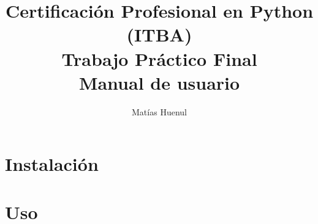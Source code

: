 \documentclass{article}
\title{Certificación Profesional en Python (ITBA) \\
Trabajo Práctico Final\\
Manual de usuario}
\author{Matías Huenul}
\date{}
\begin{document}
\maketitle
\tableofcontents
\newpage

\section{Instalación}

\section{Uso}



\end{document}
